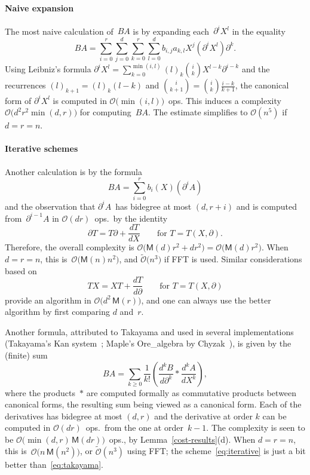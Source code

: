\documentclass{sig-alt-full}
\newcommand{\x}{X}
\newcommand{\Dx}{\partial}
\newcommand{\bigO}{{\mathcal{O}}}
\newcommand{\bigOsoft}{\tilde{\mathcal{O}}}
\newcommand{\sM}{\mathsf{M}}
\begin{document}
\paragraph*{Naive expansion}

The most naive calculation of~$BA$ is by expanding each~$\Dx^i\x^l$ in the equality
\begin{equation*}
BA = \sum_{i=0}^r\sum_{j=0}^d\sum_{k=0}^r\sum_{l=0}^db_{i,j}a_{k,l}\x^j\left(\Dx^i\x^l\right)\Dx^k.
\end{equation*}
 Using Leibniz's formula $\Dx^i\x^l = \sum_{k=0}^{\min(i,l)}(l)_k\binom ik \x^{l-k} \Dx^{i-k}$ and the recurrences $(l)_{k+1} = (l)_k (l-k)$ and $\binom i{k+1} = \binom ik  \frac{i-k}{k+1}$, the canonical form of $\Dx^i\x^l$ is computed in $\bigO\bigl(\min(i,l)\bigr)$~ops. 
This induces a complexity $\bigO\bigl(d^2r^2\min(d,r)\bigr)$ for computing~$BA$.
The estimate simplifies to $\bigO(n^5)$ if~$d=r=n$.

\paragraph*{Iterative schemes}
Another calculation is by the formula
\begin{equation}\label{eq:iterative}
BA = \sum_{i=0}^rb_i(\x)\left(\Dx^iA\right)
\end{equation}
and the observation that $\Dx^iA$~has bidegree at most $(d,r+i)$ and is computed from~$\Dx^{i-1}A$ in $\bigO(dr)$~ops.\ by the identity
\begin{equation}\label{eq:DxT}
\Dx T=T\Dx+\frac{dT}{d\x}\qquad\text{for $T=T(\x,\Dx)$}.
\end{equation}
Therefore, the overall complexity is $\bigO\bigl(\sM(d)r^2+dr^2\bigr)=\bigO\bigl(\sM(d)r^2\bigr)$.
When $d=r=n$, this is~$\bigO\bigl(\sM(n)n^2\bigr)$, and $\bigOsoft\bigl(n^3\bigr)$ if FFT is used.
Similar considerations based on
\begin{equation}\label{eq:Tx}
T\x=\x T+\frac{dT}{d\Dx}\qquad\text{for $T=T(\x,\Dx)$}
\end{equation}
provide an algorithm in $\bigO\bigl(d^2\,\sM(r)\bigr)$, and one can always use the better algorithm by first comparing $d$ and~$r$.

Another formula, attributed to Takayama and used in several implementations (Takayama's \textsf{Kan} system~\cite{Kan}; Maple's \textsf{Ore\_algebra} by Chyzak~\cite{Ore_algebra}), is given by the (finite) sum
\begin{equation}\label{eq:takayama}
BA=\sum_{k\geq0}\frac1{k!}\left(\frac{d^kB}{d\Dx^k}\ast\frac{d^kA}{d\x^k}\right),
\end{equation}
where the products~$\ast$ are computed formally as commutative products between canonical forms, the resulting sum being viewed as a canonical form.
Each of the derivatives has bidegree at most $(d,r)$ and the derivative at order $k$ can be computed in $\bigO(dr)$~ops.\ from the one at order~$k-1$.
The complexity is seen to be $\bigO\bigl(\min(d,r)\,\sM(dr)\bigr)$~ops., by Lemma~\ref{cost-results}(d).
When $d=r=n$, this is~$\bigO\bigl(n\,\sM(n^2)\bigr)$, or $\bigOsoft(n^3)$ using FFT;
the scheme~\eqref{eq:iterative} is just a bit better than~\eqref{eq:takayama}.
\end{document}
